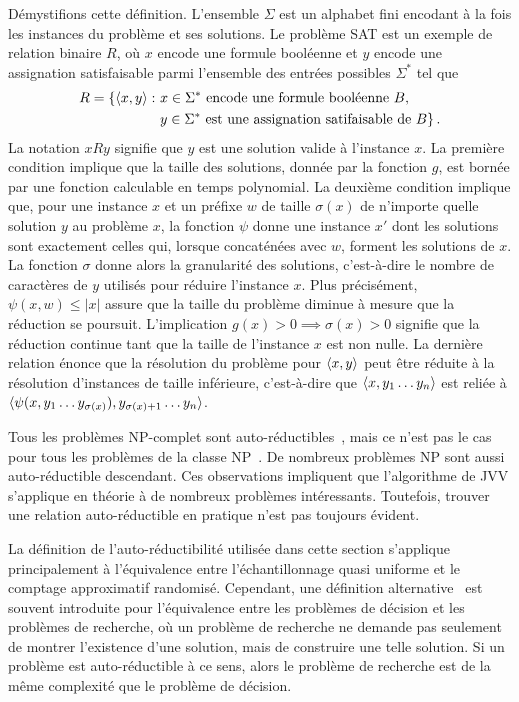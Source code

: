 Démystifions cette définition. L'ensemble $\Sigma$ est un alphabet fini encodant à la fois les instances du problème et ses solutions. Le problème SAT est un exemple de relation binaire $R$, où $x$ encode une formule booléenne et $y$ encode une assignation satisfaisable parmi l'ensemble des entrées possibles $\Sigma^{*}$ tel que
\begin{equation}
    \begin{aligned}
    R = \{ \braket{x, y} : \ & x \in \Sigma^{*} \text{ encode une formule booléenne } B, \\ 
    & y \in \Sigma^{*} \text{ est une assignation satifaisable de } B \} \,.
    \end{aligned}
\end{equation}
La notation $xRy$ signifie que $y$ est une solution valide à l'instance $x$. La première condition implique que la taille des solutions, donnée par la fonction $g$, est bornée par une fonction calculable en temps polynomial. La deuxième condition implique que, pour une instance $x$ et un préfixe $w$ de taille $\sigma(x)$ de n'importe quelle solution $y$ au problème $x$, la fonction $\psi$ donne une instance $x'$ dont les solutions sont exactement celles qui, lorsque concaténées avec $w$, forment les solutions de $x$. La fonction $\sigma$ donne alors la granularité des solutions, c'est-à-dire le nombre de caractères de $y$ utilisés pour réduire l'instance $x$. Plus précisément, $\psi(x, w) \leq \lvert x \rvert$ assure que la taille du problème diminue à mesure que la réduction se poursuit. L'implication $g(x) > 0 \implies  \sigma(x) > 0$ signifie que la réduction continue tant que la taille de l'instance $x$ est non nulle. La dernière relation énonce que la résolution du problème pour $\braket{x, y}$ peut être réduite à la résolution d'instances de taille inférieure, c'est-à-dire que $\braket{x, y_{1}\dots y_{n}}$ est reliée à $\braket{\psi(x, y_{1}\dots y_{\sigma (x)}), y_{\sigma(x)+1}\dots y_{n}}$.

Tous les problèmes \textsf{NP}-complet sont auto-réductibles~\cite{goldreichComputationalComplexityConceptual2008}, mais ce n'est pas le cas pour tous les problèmes de la classe \textsf{NP}~\cite{khullerPlanarGraphColoring1991a}. De nombreux problèmes \textsf{NP} sont aussi auto-réductible descendant. Ces observations impliquent que l'algorithme de JVV s'applique en théorie à de nombreux problèmes intéressants. Toutefois, trouver une relation auto-réductible en pratique n'est pas toujours évident.

La définition de l'auto-réductibilité utilisée dans cette section s'applique principalement à l'équivalence entre l'échantillonnage quasi uniforme et le comptage approximatif randomisé. Cependant, une définition alternative~\cite{goldreichComputationalComplexityConceptual2008} est souvent introduite pour l'équivalence entre les problèmes de décision et les problèmes de recherche, où un problème de recherche ne demande pas seulement de montrer l'existence d'une solution, mais de construire une telle solution. Si un problème est auto-réductible à ce sens, alors le problème de recherche est de la même complexité que le problème de décision. 

